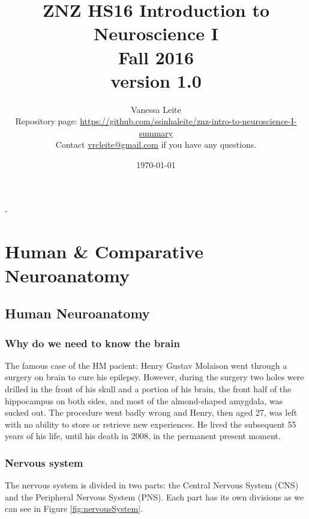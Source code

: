 \documentclass[12pt,article,oneside,a4paper]{memoir}
\title{\textbf{ZNZ HS16 Introduction to Neuroscience I} \\
       Fall 2016\\\normalsize version 1.0}
\author{
	Vanessa Leite
	\vspace{2em}
	\\Repository page: \url{https://github.com/ssinhaleite/znz-intro-to-neuroscience-I-summary}\\
	Contact \href{mailto:vrcleite@gmail.com}{vrcleite@gmail.com} if you have any questions.}
\date{\today}
\begin{document}
\frontmatter


\begin{titlingpage}
  \calccentering{\unitlength}
  \begin{adjustwidth*}{\unitlength-24pt}{-\unitlength-24pt}
    \maketitle
  \end{adjustwidth*}
\end{titlingpage}

\mainmatter



\newpage
\clearpage
{}
\setcounter{tocdepth}{3}
\setcounter{secnumdepth}{2}
\tableofcontents

\clearpage
{}

\newpage

\section{Human \& Comparative Neuroanatomy}
\subsection{Human Neuroanatomy}
\subsubsection{Why do we need to know the brain}
The famous case of the HM pacient: Henry Gustav Molaison went through a surgery on brain to cure his epilepsy. However, during the surgery two holes were drilled in the front of his skull and a portion of his brain, the front half of the hippocampus on both sides, and most of the almond-shaped amygdala, was sucked out. The procedure went badly wrong and Henry, then aged 27, was left with no ability to store or retrieve new experiences. He lived the subsequent 55 years of his life, until his death in 2008, in the permanent present moment.

\subsubsection{Nervous system}
The nervous system is divided in two parts: the Central Nervous System (CNS) and
the Peripheral Nervous System (PNS). Each part has its own divisions as we can see in Figure \ref{fig:nervousSystem}.
\end{document}
